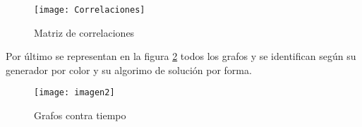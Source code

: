 \documentclass[a4paper, 11pt]{article}
\begin{document}
\begin{figure}[H]
\centering
\texttt{[image: Correlaciones]}
\caption{Matriz de correlaciones} \label{figure8}
\end{figure}

Por último se representan en la figura \ref{figure9} todos los grafos y se identifican según su generador por color y su algorimo de solución por forma.
\begin{figure}[H]
\centering
\texttt{[image: imagen2]}
\caption{Grafos contra tiempo} \label{figure9}
\end{figure}




\nocite{*}
\end{document}
